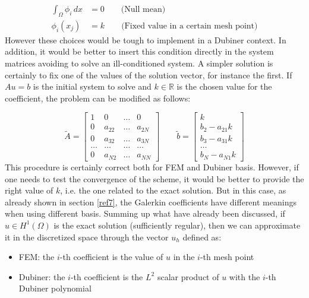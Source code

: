 \documentclass[a4paper]{article}
\begin{document}
\begin{equation}
\begin{split}
\int_{\Omega}\phi_i \,dx &= 0 \quad \quad \text{(Null mean)}  \\
\phi_i(x_j)&=k \quad \quad \text{(Fixed value in a certain mesh point)}
\end{split}
\end{equation}
\vspace{5mm}\newline
\noindent However these choices would be tough to implement in a Dubiner context. In addition, it would be better to insert this condition directly in the system matrices avoiding to solve an ill-conditioned system. A simpler solution is certainly to fix one of the values of the solution vector, for instance the first. If $Au=b$ is the initial system to solve and $k\in\mathbb{R}$ is the chosen value for the coefficient, the problem can be modified as follows:

\begin{equation}
\tilde{A}=\begin{bmatrix}
1 & 0 & \dots & 0 \\ 
0 & a_{22} & \dots & a_{2N} \\ 
0 &a_{32} & \dots & a_{3N} \\
\dots & \dots & \dots & \dots \\
0  & a_{N2} & \dots & a_{NN}
\end{bmatrix} \quad \quad
\tilde{b}=\begin{bmatrix}
k \\ b_2 -a_{21}k \\ b_3-a_{31}k \\ \dots \\ b_N-a_{N1}k
\end{bmatrix}
\end{equation} 
\vspace{5mm}\newline
This procedure is certainly correct both for FEM and Dubiner basis. However, if one needs to test the convergence of the scheme, it would be better to provide the right value of $k$, i.e. the one related to the exact solution. But in this case, as already shown in section \ref{ref7}, the Galerkin coefficients have different meanings when using different basis.
\newline Summing up what have already been discussed, if $u\in H^1(\Omega)$ is the exact solution (sufficiently regular), then we can approximate it in the discretized space through the vector $u_h$ defined as:
\begin{itemize}
	\item FEM: the $i$-th coefficient is the value of $u$ in the $i$-th mesh point
	\item Dubiner: the $i$-th coefficient is the $L^2$ scalar product of $u$ with the $i$-th Dubiner polynomial
\end{itemize}
\end{document}
